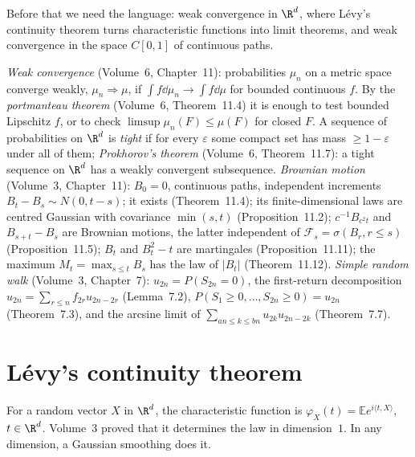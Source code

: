 Before that we need the language: weak convergence in $\R^d$, where L\'evy's continuity theorem turns characteristic functions into limit
theorems, and weak convergence in the space $C[0,1]$ of continuous paths.

\begin{reminder}
\emph{Weak convergence} (Volume~6, Chapter~11): probabilities $\mu_n$ on a metric space converge weakly, $\mu_n\Rightarrow\mu$, if $\int f\dd\mu_n\to\int f\dd\mu$
for bounded continuous $f$. By the \emph{portmanteau theorem} (Volume~6, Theorem~11.4) it is enough to test bounded Lipschitz $f$, or to check
$\limsup\mu_n(F)\le\mu(F)$ for closed $F$. A sequence of probabilities on $\R^d$ is \emph{tight} if for every $\varepsilon$ some compact set has mass
$\ge1-\varepsilon$ under all of them; \emph{Prokhorov's theorem} (Volume~6, Theorem~11.7): a tight sequence on $\R^d$ has a weakly convergent subsequence.
\emph{Brownian motion} (Volume~3, Chapter~11): $B_0=0$, continuous paths, independent increments $B_t-B_s\sim N(0,t-s)$; it exists (Theorem~11.4); its
finite-dimensional laws are centred Gaussian with covariance $\min(s,t)$ (Proposition~11.2); $c^{-1}B_{c^2t}$ and $B_{s+t}-B_s$ are Brownian motions, the
latter independent of $\mathcal F_s=\sigma(B_r,r\le s)$ (Proposition~11.5); $B_t$ and $B_t^2-t$ are martingales (Proposition~11.11); the maximum
$M_t=\max_{s\le t}B_s$ has the law of $|B_t|$ (Theorem~11.12). \emph{Simple random walk} (Volume~3, Chapter~7): $u_{2n}=P(S_{2n}=0)$, the first-return
decomposition $u_{2n}=\sum_{r\le n}f_{2r}u_{2n-2r}$ (Lemma~7.2), $P(S_1\ge0,\dots,S_{2n}\ge0)=u_{2n}$ (Theorem~7.3), and the arcsine limit of
$\sum_{an\le k\le bn}u_{2k}u_{2n-2k}$ (Theorem~7.7).
\end{reminder}

\section{L\'evy's continuity theorem}

For a random vector $X$ in $\R^d$, the characteristic function is $\varphi_X(t)=\mathbb E e^{i\langle t,X\rangle}$, $t\in\R^d$. Volume~3 proved that it
determines the law in dimension~$1$. In any dimension, a Gaussian smoothing does it.

